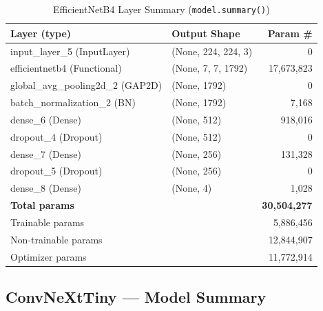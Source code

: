 \documentclass[12pt,a4paper]{article}
\begin{document}
\begin{table}[H]
\centering
\caption{EfficientNetB4 Layer Summary (\texttt{model.summary()})}
\label{tab:summary_efficientnetb4}
\begin{tabular}{l l r}
  \toprule
  \textbf{Layer (type)} & \textbf{Output Shape} & \textbf{Param \#} \\
  \midrule
  input\_layer\_5 (InputLayer)         & (None, 224, 224, 3)  &            0 \\
  efficientnetb4 (Functional)          & (None, 7, 7, 1792)   &   17,673,823 \\
  global\_avg\_pooling2d\_2 (GAP2D)    & (None, 1792)         &            0 \\
  batch\_normalization\_2 (BN)         & (None, 1792)         &        7,168 \\
  dense\_6 (Dense)                     & (None, 512)          &      918,016 \\
  dropout\_4 (Dropout)                 & (None, 512)          &            0 \\
  dense\_7 (Dense)                     & (None, 256)          &      131,328 \\
  dropout\_5 (Dropout)                 & (None, 256)          &            0 \\
  dense\_8 (Dense)                     & (None, 4)            &        1,028 \\
  \midrule
  \multicolumn{2}{l}{\textbf{Total params}}    & \textbf{30,504,277} \\
  \multicolumn{2}{l}{Trainable params}         &       5,886,456 \\
  \multicolumn{2}{l}{Non-trainable params}     &      12,844,907 \\
  \multicolumn{2}{l}{Optimizer params}         &      11,772,914 \\
  \bottomrule
\end{tabular}
\end{table}

\subsection{ConvNeXtTiny --- Model Summary}
\end{document}
